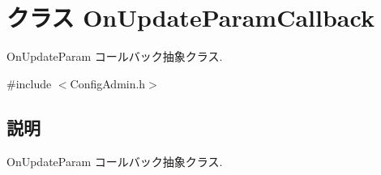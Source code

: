\section{クラス OnUpdateParamCallback}
\label{classOnUpdateParamCallback}


OnUpdateParam コールバック抽象クラス.  




{\ttfamily \#include $<$ConfigAdmin.h$>$}



\subsection{説明}
OnUpdateParam コールバック抽象クラス. 